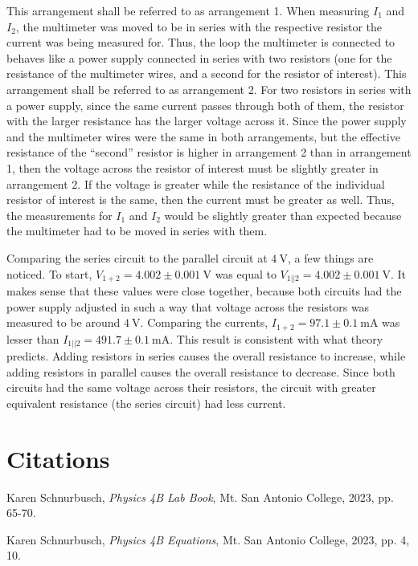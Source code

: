\documentclass[12pt]{iopart} %
\gdef\units#1{~\mathrm{#1}}
\begin{document}
This arrangement shall be referred to as arrangement 1.
When measuring $I_1$ and $I_2$, the multimeter was moved to be in series with the respective resistor the current was being measured for.
Thus, the loop the multimeter is connected to behaves like a power supply connected in series with two resistors (one for the resistance of the multimeter wires, and a second for the resistor of interest).
This arrangement shall be referred to as arrangement 2.
For two resistors in series with a power supply, since the same current passes through both of them, the resistor with the larger resistance has the larger voltage across it.
Since the power supply and the multimeter wires were the same in both arrangements, but the effective resistance of the ``second'' resistor is higher in arrangement 2 than in arrangement 1, then the voltage across the resistor of interest must be slightly greater in arrangement 2.
If the voltage is greater while the resistance of the individual resistor of interest is the same, then the current must be greater as well.
Thus, the measurements for $I_1$ and $I_2$ would be slightly greater than expected because the multimeter had to be moved in series with them.

Comparing the series circuit to the parallel circuit at $4 \units{V}$, a few things are noticed.
To start, $V_{1+2} = 4.002 \pm 0.001 \units{V}$ was equal to $V_{1||2} = 4.002 \pm 0.001 \units{V}$.
It makes sense that these values were close together, because both circuits had the power supply adjusted in such a way that voltage across the resistors was measured to be around $4 \units{V}$.
Comparing the currents, $I_{1+2} = 97.1 \pm 0.1 \units{mA}$ was lesser than $I_{1||2} = 491.7 \pm 0.1 \units{mA}$.
This result is consistent with what theory predicts.
Adding resistors in series causes the overall resistance to increase, while adding resistors in parallel causes the overall resistance to decrease.
Since both circuits had the same voltage across their resistors, the circuit with greater equivalent resistance (the series circuit) had less current.

\section{Citations}

\begin{thebibliography}{9}

  Karen Schnurbusch,
  \textit{Physics 4B Lab Book},
  Mt. San Antonio College,
  2023,
  pp. 65-70.

  Karen Schnurbusch,
  \textit{Physics 4B Equations},
  Mt. San Antonio College,
  2023,
  pp. 4, 10.

\end{thebibliography}
\end{document}
